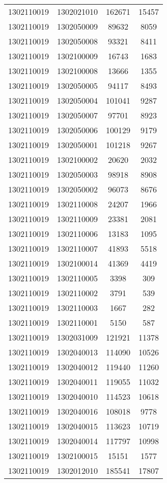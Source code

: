 \begin{longtable}[h]{llcc}
		1302110019 & 1302021010 & 162671 & 15457\\
		1302110019 & 1302050009 & 89632 & 8059\\
		1302110019 & 1302050008 & 93321 & 8411\\
		1302110019 & 1302100009 & 16743 & 1683\\
		1302110019 & 1302100008 & 13666 & 1355\\
		1302110019 & 1302050005 & 94117 & 8493\\
		1302110019 & 1302050004 & 101041 & 9287\\
		1302110019 & 1302050007 & 97701 & 8923\\
		1302110019 & 1302050006 & 100129 & 9179\\
		1302110019 & 1302050001 & 101218 & 9267\\
		1302110019 & 1302100002 & 20620 & 2032\\
		1302110019 & 1302050003 & 98918 & 8908\\
		1302110019 & 1302050002 & 96073 & 8676\\
		1302110019 & 1302110008 & 24207 & 1966\\
		1302110019 & 1302110009 & 23381 & 2081\\
		1302110019 & 1302110006 & 13183 & 1095\\
		1302110019 & 1302110007 & 41893 & 5518\\
		1302110019 & 1302100014 & 41369 & 4419\\
		1302110019 & 1302110005 & 3398 & 309\\
		1302110019 & 1302110002 & 3791 & 539\\
		1302110019 & 1302110003 & 1667 & 282\\
		1302110019 & 1302110001 & 5150 & 587\\
		1302110019 & 1302031009 & 121921 & 11378\\
		1302110019 & 1302040013 & 114090 & 10526\\
		1302110019 & 1302040012 & 119440 & 11260\\
		1302110019 & 1302040011 & 119055 & 11032\\
		1302110019 & 1302040010 & 114523 & 10618\\
		1302110019 & 1302040016 & 108018 & 9778\\
		1302110019 & 1302040015 & 113623 & 10719\\
		1302110019 & 1302040014 & 117797 & 10998\\
		1302110019 & 1302100015 & 15151 & 1577\\
		1302110019 & 1302012010 & 185541 & 17807\\

\end{longtable}

